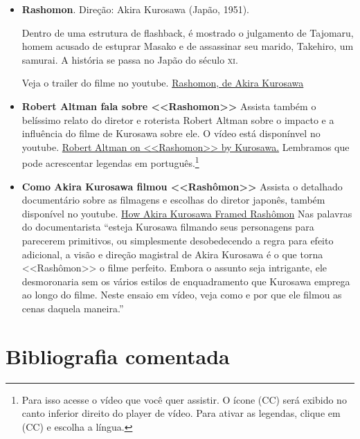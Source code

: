 \documentclass[12pt]{extarticle}
\begin{document}
\begin{itemize} 

\item\textbf{Rashomon}. Direção: Akira Kurosawa (Japão, 1951).

Dentro de uma estrutura de flashback, é mostrado o julgamento de Tajomaru,
homem acusado de estuprar Masako e de assassinar seu marido, Takehiro, um
samurai. A história se passa no Japão do século \textsc{xi}. 

Veja o trailer do filme no youtube. 
\href{https://www.youtube.com/watch?v=WKd4tIHB064}{Rashomon, de Akira Kurosawa}  

\item\textbf{Robert Altman fala sobre <<Rashomon>>} 
Assista também o belíssimo relato do diretor e roterista Robert Altman 
sobre o impacto e a influência do filme de Kurosawa sobre ele. 
O vídeo está disponínvel no youtube. 
\href{https://www.youtube.com/watch?v=oYWQa0GExt8}{Robert Altman on 
<<Rashomon>> by Kurosawa.} Lembramos que pode acrescentar legendas em 
português.\footnote{Para isso acesse o vídeo que você quer assistir.
O ícone (CC) será exibido no canto inferior direito do player de vídeo.
Para ativar as legendas, clique em (CC) e escolha a língua.}

\item\textbf{Como Akira Kurosawa filmou <<Rashômon>>} Assista 
o detalhado documentário
sobre as filmagens e escolhas do diretor japonês, também 
disponível no youtube. 
\href{https://www.youtube.com/watch?v=-tkDU0_r8dU}{How Akira Kurosawa Framed Rashômon}
Nas palavras do documentarista ``esteja Kurosawa 
filmando seus personagens para parecerem primitivos, 
ou simplesmente desobedecendo a regra para efeito adicional, 
a visão e direção magistral de Akira Kurosawa é o que torna <<Rashômon>> 
o filme perfeito. Embora o assunto seja intrigante, ele desmoronaria 
sem os vários estilos de enquadramento que Kurosawa emprega ao longo 
do filme. Neste ensaio em vídeo, veja como e por que ele filmou 
as cenas daquela maneira.''

\end{itemize}

\section{Bibliografia comentada}
\end{document}
